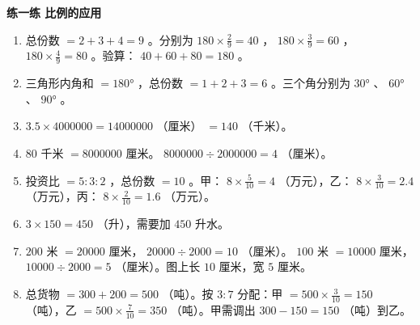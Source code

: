 \begin{answer}
\textbf{练一练 比例的应用}

\begin{enumerate}
  \item 总份数 $= 2 + 3 + 4 = 9$ 。分别为 $180 \times \frac{2}{9} = 40$ ， $180 \times \frac{3}{9} = 60$ ， $180 \times \frac{4}{9} = 80$ 。验算： $40 + 60 + 80 = 180$ 。
  \item 三角形内角和 $= 180°$ ，总份数 $= 1 + 2 + 3 = 6$ 。三个角分别为 $30°$ 、 $60°$ 、 $90°$ 。
  \item $3.5 \times 4000000 = 14000000$ （厘米） $= 140$ （千米）。
  \item $80$ 千米 $= 8000000$ 厘米。 $8000000 \div 2000000 = 4$ （厘米）。
  \item 投资比 $= 5 : 3 : 2$ ，总份数 $= 10$ 。甲： $8 \times \frac{5}{10} = 4$ （万元），乙： $8 \times \frac{3}{10} = 2.4$ （万元），丙： $8 \times \frac{2}{10} = 1.6$ （万元）。
  \item $3 \times 150 = 450$ （升），需要加 $450$ 升水。
  \item $200$ 米 $= 20000$ 厘米， $20000 \div 2000 = 10$ （厘米）。 $100$ 米 $= 10000$ 厘米， $10000 \div 2000 = 5$ （厘米）。图上长 $10$ 厘米，宽 $5$ 厘米。
  \item 总货物 $= 300 + 200 = 500$ （吨）。按 $3 : 7$ 分配：甲 $= 500 \times \frac{3}{10} = 150$ （吨），乙 $= 500 \times \frac{7}{10} = 350$ （吨）。甲需调出 $300 - 150 = 150$ （吨）到乙。
\end{enumerate}


\end{answer}
